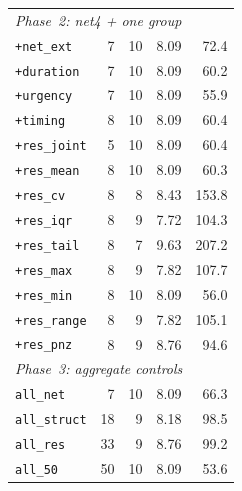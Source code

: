 \begin{table}[htbp]
\begin{tabular}{l r r r r}
\hline
\multicolumn{5}{l}{\emph{Phase~2: net4 + one group}} \\
\texttt{+net\_ext}           & 7  & 10 & 8.09 & 72.4 \\
\texttt{+duration}           & 7  & 10 & 8.09 & 60.2 \\
\texttt{+urgency}            & 7  & 10 & 8.09 & 55.9 \\
\texttt{+timing}             & 8  & 10 & 8.09 & 60.4 \\
\texttt{+res\_joint}         & 5  & 10 & 8.09 & 60.4 \\
\texttt{+res\_mean}          & 8  & 10 & 8.09 & 60.3 \\
\texttt{+res\_cv}            & 8  &  8 & 8.43 & 153.8 \\
\texttt{+res\_iqr}           & 8  &  9 & 7.72 & 104.3 \\
\texttt{+res\_tail}          & 8  &  7 & 9.63 & 207.2 \\
\texttt{+res\_max}           & 8  &  9 & 7.82 & 107.7 \\
\texttt{+res\_min}           & 8  & 10 & 8.09 & 56.0 \\
\texttt{+res\_range}         & 8  &  9 & 7.82 & 105.1 \\
\texttt{+res\_pnz}           & 8  &  9 & 8.76 & 94.6 \\
\hline
\multicolumn{5}{l}{\emph{Phase~3: aggregate controls}} \\
\texttt{all\_net}            & 7  & 10 & 8.09 & 66.3 \\
\texttt{all\_struct}         & 18 &  9 & 8.18 & 98.5 \\
\texttt{all\_res}            & 33 &  9 & 8.76 & 99.2 \\
\texttt{all\_50}             & 50 & 10 & 8.09 & 53.6 \\
\hline
\end{tabular}
\end{table}
